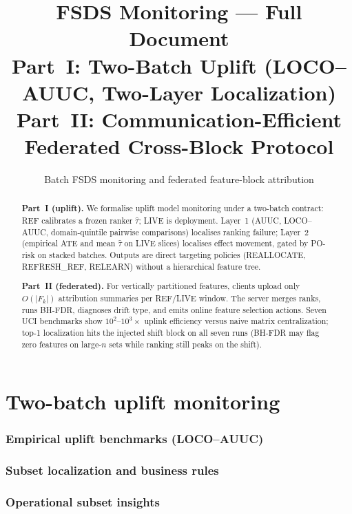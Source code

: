 \documentclass[11pt]{article}
\title{FSDS Monitoring --- Full Document\\[0.4em]
\large Part~I: Two-Batch Uplift (LOCO--AUUC, Two-Layer Localization)\quad
Part~II: Communication-Efficient Federated Cross-Block Protocol}
\author{Batch FSDS monitoring and federated feature-block attribution}
\date{}
\begin{document}
\maketitle
\tableofcontents
\newpage

\begin{abstract}
\textbf{Part~I (uplift).}
We formalise uplift model monitoring under a two-batch contract: REF calibrates a frozen ranker $\hat\tau$; LIVE is deployment.
Layer~1 (AUUC, LOCO--AUUC, domain-quintile pairwise comparisons) localises ranking failure; Layer~2 (empirical ATE and mean $\hat\tau$ on LIVE slices) localises effect movement, gated by PO-risk on stacked batches.
Outputs are direct targeting policies (REALLOCATE, REFRESH\_REF, RELEARN) without a hierarchical feature tree.

\textbf{Part~II (federated).}
For vertically partitioned features, clients upload only $O(|F_k|)$ attribution summaries per REF/LIVE window.
The server merges ranks, runs BH-FDR, diagnoses drift type, and emits online feature selection actions.
Seven UCI benchmarks show $10^2$--$10^3\times$ uplink efficiency versus naive matrix centralization; top-1 localization hits the injected shift block on all seven runs (BH-FDR may flag zero features on large-$n$ sets while ranking still peaks on the shift).
\end{abstract}

\part{Two-batch uplift monitoring}



\section{Empirical uplift benchmarks (LOCO--AUUC)}


\section{Subset localization and business rules}


\section{Operational subset insights}

\end{document}
